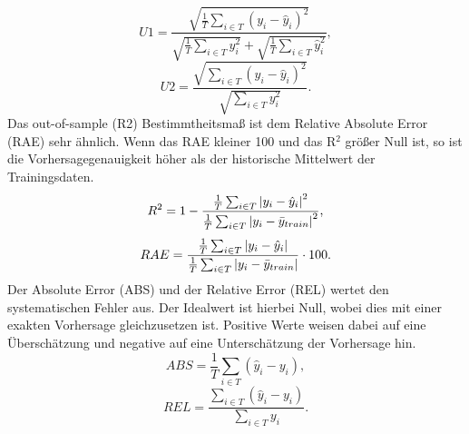 \begin{equation}
U1 = \frac{\sqrt{\frac{1}{T} \sum_{i \in T} (y_i-\hat{y}_i)^2}}{ \sqrt{\frac{1}{T} \sum_{i \in T} y_i^2} + \sqrt{\frac{1}{T} \sum_{i \in T} \hat{y}_i^2}},
\label{gl:U1}
\end{equation}
%
\begin{equation}
U2 = \frac{\sqrt{\sum_{i \in T} (y_i-\hat{y}_i)^2}}{ \sqrt{ \sum_{i \in T} y_i^2} }.
\label{gl:U2}
\end{equation}
%
%
Das out-of-sample (\gls{R2}) Bestimmtheitsmaß ist dem Relative Absolute Error (\gls{RAE}) sehr ähnlich. Wenn das RAE kleiner 100 und das R$^2$ größer Null ist, so ist die Vorhersagegenauigkeit höher als der historische Mittelwert der Trainingsdaten.
\begin{equation}
R^2 = 1 -  \frac{\frac{1}{T} \sum_{i \in T} \abs{y_i-\hat{y}_i}^2}{ \frac{1}{T} \sum_{i \in T} \abs{y_i-\bar{y}_{train}}^2 } ,
\label{gl:R2}
\end{equation}
%
%
\begin{equation}
RAE = \frac{\frac{1}{T} \sum_{i \in T} \abs{y_i-\hat{y}_i}}{ \frac{1}{T} \sum_{i \in T} \abs{y_i-\bar{y}_{train}} } \cdot 100 .
\label{gl:RAE}
\end{equation}
%
%
Der Absolute Error (\gls{ABS}) und der Relative Error (\gls{REL}) wertet den systematischen Fehler aus. Der Idealwert ist hierbei Null, wobei dies mit einer exakten Vorhersage gleichzusetzen ist. Positive Werte weisen dabei auf eine Überschätzung und negative auf eine Unterschätzung der Vorhersage hin.\,
%
\begin{equation}
ABS= \frac{1}{T} \sum\limits_{i \in T} (\hat{y}_i-y_i),
\label{gl:ABS}
\end{equation}
%
%
\begin{equation}
REL= \frac{\sum_{i \in T} (\hat{y}_i-y_i)}{\sum_{i \in T} y_i} .
\label{gl:REL}
\end{equation}



%        

%        

